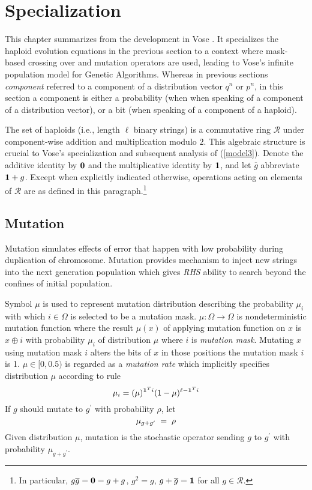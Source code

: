 \chapter{Specialization}\label{ch:specialize}
This chapter summarizes from the development in Vose \cite{Vose1999}.
It specializes the haploid evolution equations in the previous section 
to a context where mask-based crossing over and mutation operators are used, 
leading to Vose's infinite population model for Genetic Algorithms.  Whereas 
in previous sections {\em component} referred to a component
of a distribution vector $q^n$ or $p^n$, in this section a component
is either a probability (when when speaking of a component of a
distribution vector), or a bit (when speaking of a component of a
haploid).

The set of haploids (i.e., length $\ell$ binary strings) is a
commutative ring $\mathcal{R}$ under component-wise addition and
multiplication modulo $2$.  This algebraic structure is crucial to
Vose's specialization and subsequent analysis of
(\ref{model3}). Denote the additive identity by ${\bf 0}$ and the
multiplicative identity by ${\bf 1}$, and let $\overline{g}$
abbreviate ${\bf 1} + g$.  Except when explicitly indicated otherwise,
operations acting on elements of $\mathcal{R}$ are as defined in this
paragraph.\footnote{In particular, $g \overline{g} = {\bf 0} = g+g$,
  $g^2 = g$, $g + \overline{g} = {\bf 1}$ for all $g \in
  \mathcal{R}$.}

\section{Mutation}
Mutation simulates effects of error that happen with low probability during duplication of chromosome. Mutation provides mechanism to inject new strings into the next generation population which gives {\em RHS} ability to search beyond the confines of initial population.

Symbol $\mu$ is used to represent mutation distribution describing the probability $\mu_i$ with which $i \in \Omega$ is selected to be a mutation mask. $\mu : \Omega \rightarrow \Omega$ is nondeterministic mutation function where the result $\mu(x)$ of applying mutation function on $x$ is $x \oplus i$ with probability $\mu_i$ of distribution $\mu$ where $i$ is {\em mutation mask}. Mutating $x$ using mutation mask $i$ alters the bits of $x$ in those positions the mutation mask $i$ is 1.
$\mu \in [0, 0.5)$ is regarded as a {\em mutation rate} which implicitly specifies distribution $\mu$ according to rule 
\[
\mu_i = (\mu)^{{\bf 1}^Ti} (1-\mu)^{\ell- {\bf 1}^Ti}
\]
If $g$ should mutate to $g^\prime$ with probability $\rho$,
let\\[-0.2in]
\[
\mu_{g + g^\prime} \; = \; \rho\\[0.05in]
\]
Given distribution $\mu$, mutation is the stochastic operator sending
$g$ to $g^\prime$ with probability $\mu_{g + g^\prime}$.


